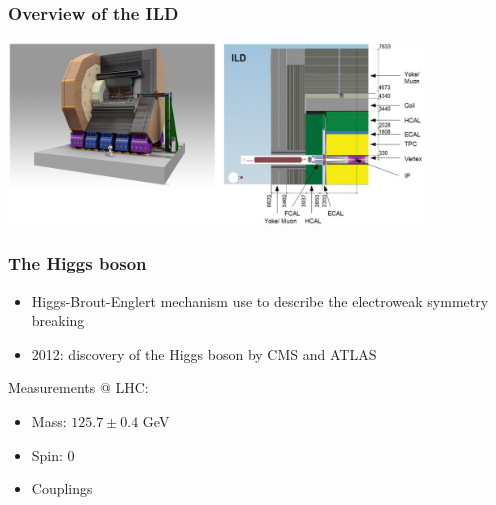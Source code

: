 \documentclass{beamer}
\begin{document}
\begin{frame}
    \frametitle{Overview of the ILD}

    \begin{center}
        \includegraphics[width = 11cm]{Pictures/ild-detector-ilc.jpg}
    \end{center}
\end{frame}


    \begin{frame}
      \frametitle{The Higgs boson}
      \begin{itemize}
        \item Higgs-Brout-Englert mechanism use to describe the electroweak symmetry breaking
        \item 2012: discovery of the Higgs boson by CMS and ATLAS
      \end{itemize}
      \begin{block}{Measurements @ LHC:}
        \begin{itemize}
          \item Mass: $125.7 \pm 0.4$ GeV
          \item Spin: 0
          \item Couplings
        \end{itemize}
      \end{block}
    \end{frame}
\end{document}

